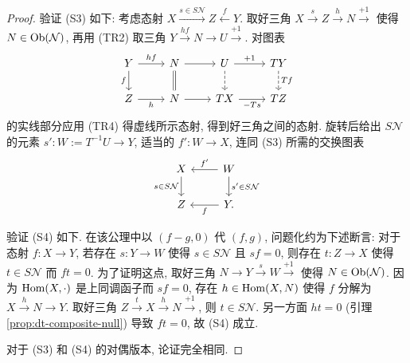 \begin{proof}
	验证 (S3) 如下: 考虑态射 $X \xrightarrow{s \in S\mathcal{N}} Z \xleftarrow{f} Y$. 取好三角 $X \xrightarrow{s} Z \xrightarrow{h} N \xrightarrow{+1}$ 使得 $N \in \operatorname{Ob}(\mathcal{N})$, 再用 (TR2) 取三角 $Y \xrightarrow{hf} N \to U \xrightarrow{+1}$. 对图表
	\[\begin{tikzcd}
		Y \arrow[r, "hf"] \arrow[d, "f"'] & N \arrow[r] \arrow[equal, d] & U \arrow[r, "+1"] \arrow[dashed, d] & TY \arrow[dashed, d, "Tf"] \\
		Z \arrow[r, "h"'] & N \arrow[r] & TX \arrow[r, "-Ts"'] & TZ
	\end{tikzcd}\]
	的实线部分应用 (TR4) 得虚线所示态射, 得到好三角之间的态射. 旋转后给出 $S\mathcal{N}$ 的元素 $s': W := T^{-1} U \to Y$, 适当的 $f': W \to X$, 连同 (S3) 所需的交换图表
	\[\begin{tikzcd}
		X \arrow[d, "{s \in S\mathcal{N}}"'] & W \arrow[d, "{s' \in S\mathcal{N}}"] \arrow[l, "{f'}"'] \\
		Z & Y \arrow[l, "f"] .
	\end{tikzcd}\]

	验证 (S4) 如下. 在该公理中以 $(f-g, 0)$ 代 $(f, g)$, 问题化约为下述断言: 对于态射 $f: X \to Y$, 若存在 $s: Y \to W$ 使得 $s \in S\mathcal{N}$ 且 $sf = 0$, 则存在 $t: Z \to X$ 使得 $t \in S\mathcal{N}$ 而 $ft = 0$. 为了证明这点, 取好三角 $N \to Y \xrightarrow{s} W \xrightarrow{+1}$ 使得 $N \in \operatorname{Ob}(\mathcal{N})$. 因为 $\operatorname{Hom}(X, \cdot)$ 是上同调函子而 $sf=0$, 存在 $h \in \operatorname{Hom}(X, N)$ 使得 $f$ 分解为 $X \xrightarrow{h} N \to Y$. 取好三角 $Z \xrightarrow{t} X \xrightarrow{h} N \xrightarrow{+1}$, 则 $t \in S\mathcal{N}$. 另一方面 $ht=0$ (引理 \ref{prop:dt-composite-null}) 导致 $ft = 0$, 故 (S4) 成立.

	对于 (S3) 和 (S4) 的对偶版本, 论证完全相同.
\end{proof}

